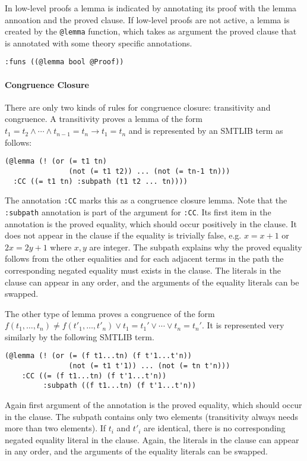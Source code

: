 \documentclass[a4paper]{article}
\begin{document}
In low-level proofs a lemma is indicated by annotating its proof with
the lemma annoation and the proved clause.  If low-level proofs are
not active, a lemma is created by the \verb+@lemma+ function, which
takes as argument the proved clause that is annotated with some theory
specific annotations.
\begin{verbatim}
:funs ((@lemma bool @Proof))
\end{verbatim}

\paragraph{Congruence Closure}

There are only two kinds of rules for congruence closure: transitivity
and congruence.  A transitivity proves a lemma of the form ${t_1 = t_2}
\land \cdots\land {t_{n-1}= t_n} \rightarrow {t_1 = t_n}$ and is
represented by an SMTLIB term as follows:

\begin{verbatim}
(@lemma (! (or (= t1 tn)
               (not (= t1 t2)) ... (not (= tn-1 tn)))
  :CC ((= t1 tn) :subpath (t1 t2 ... tn))))
\end{verbatim}

The annotation \verb+:CC+ marks this as a congruence closure lemma.
Note that the \verb+:subpath+ annotation is part of the argument for
\verb+:CC+.  Its first item in the annotation is the proved equality,
which should occur positively in the clause.  It does not appear in
the clause if the equality is trivially false, e.g. $x = x+1$ or $2x =
2y+1$ where $x,y$ are integer.  The subpath explains why the proved
equality follows from the other equalities and for each adjacent terms
in the path the corresponding negated equality must exists in the
clause.  The literals in the clause can appear in any order, and the
arguments of the equality literals can be swapped.

The other type of lemma proves a congruence of the form $f(t_1, \dots,
t_n)\neq f(t'_1,\dots,t'_n) \lor t_1=t_1' \lor \cdots \lor t_n=t_n'$.
It is represented very similarly by the following SMTLIB term.

\begin{verbatim}
(@lemma (! (or (= (f t1...tn) (f t'1...t'n))
               (not (= t1 t'1)) ... (not (= tn t'n)))
    :CC ((= (f t1...tn) (f t'1...t'n)) 
         :subpath ((f t1...tn) (f t'1...t'n))
\end{verbatim}

Again first argument of the annotation is the proved equality, which
should occur in the clause.  The subpath contains only two
elements (transitivity always needs more than two elements).  If $t_i$
and $t'_i$ are identical, there is no corresponding negated equality
literal in the clause.  Again, the literals in the clause can appear
in any order, and the arguments of the equality literals can be
swapped.
\end{document}
